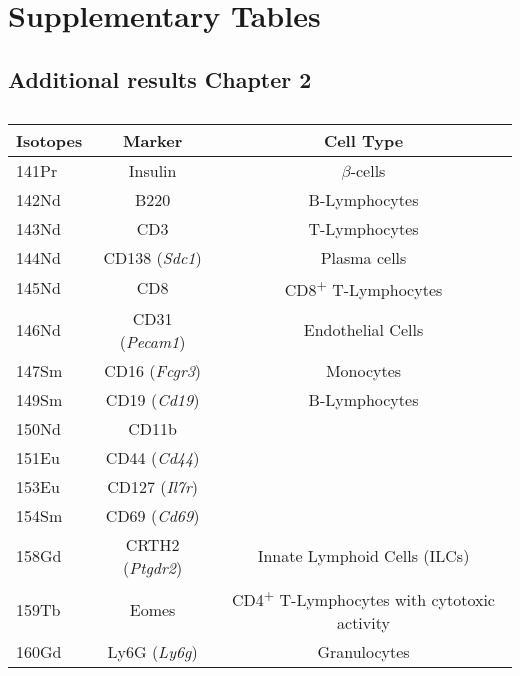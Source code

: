 \chapter{Supplementary Tables} 
\clearpage

\section{Additional results Chapter 2}

\begin{table}[ht!]
  \renewcommand{\arraystretch}{1.2} %
  \centering
  \begin{tabularx}{\textwidth}{|G|C|C|}
    \hline
    \textbf{Isotopes} & \textbf{Marker} & \textbf{Cell Type} \\
    \hline
    141Pr & Insulin & $\beta$-cells \\
    \hline
    142Nd & B220 & B-Lymphocytes \\
    \hline
    143Nd & CD3 & T-Lymphocytes \\
    \hline
    144Nd & CD138 (\textit{Sdc1}) & Plasma cells \\
    \hline
    145Nd & CD8 & CD8\textsuperscript{+} T-Lymphocytes \\
    \hline
    146Nd & CD31 (\textit{Pecam1}) & Endothelial Cells \\
    \hline
    147Sm & CD16 (\textit{Fcgr3}) & Monocytes \\
    \hline
    149Sm & CD19 (\textit{Cd19}) & B-Lymphocytes \\
    \hline
    150Nd & CD11b &  \\
    \hline
    151Eu & CD44 (\textit{Cd44}) &  \\
    \hline
    153Eu & CD127 (\textit{Il7r}) &  \\
    \hline
    154Sm & CD69 (\textit{Cd69}) &  \\
    \hline
    158Gd & CRTH2 (\textit{Ptgdr2}) & Innate Lymphoid Cells (ILCs) \\
    \hline
    159Tb & Eomes & CD4\textsuperscript{+} T-Lymphocytes with cytotoxic activity \\
    \hline
    160Gd & Ly6G (\textit{Ly6g}) & Granulocytes \\
    \hline
  \end{tabularx}
  \caption[]{}
  \label{tab2-1}
\end{table}

